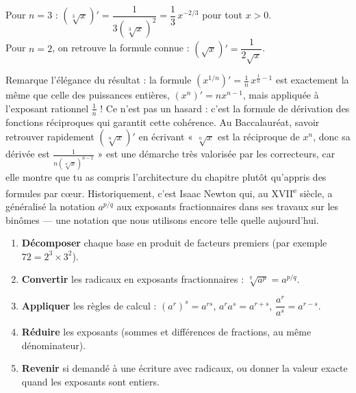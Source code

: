 \documentclass[11pt]{article}
\begin{document}
\begin{exemplebox}
Pour $n = 3$ : $\left(\sqrt[3]{x}\right)' = \dfrac{1}{3\left(\sqrt[3]{x}\right)^2} = \dfrac{1}{3}\,x^{-2/3}$ pour tout $x > 0$.\\
Pour $n = 2$, on retrouve la formule connue : $(\sqrt{x})' = \dfrac{1}{2\sqrt{x}}$.
\end{exemplebox}

\begin{savaistu}
Remarque l'élégance du résultat : la formule $\left(x^{1/n}\right)' = \frac{1}{n}\,x^{\frac{1}{n}-1}$ est exactement la même que celle des puissances entières, $(x^n)' = n x^{n-1}$, mais appliquée à l'exposant rationnel $\frac{1}{n}$ ! Ce n'est pas un hasard : c'est la formule de dérivation des fonctions réciproques qui garantit cette cohérence. Au Baccalauréat, savoir retrouver rapidement $(\sqrt[n]{x})'$ en écrivant « $\sqrt[n]{x}$ est la réciproque de $x^n$, donc sa dérivée est $\frac{1}{n(\sqrt[n]{x})^{n-1}}$ » est une démarche très valorisée par les correcteurs, car elle montre que tu as compris l'architecture du chapitre plutôt qu'appris des formules par cœur. Historiquement, c'est Isaac Newton qui, au XVII\textsuperscript{e} siècle, a généralisé la notation $a^{p/q}$ aux exposants fractionnaires dans ses travaux sur les binômes — une notation que nous utilisons encore telle quelle aujourd'hui.
\end{savaistu}

\begin{methode}
\begin{enumerate}
\item \textbf{Décomposer} chaque base en produit de facteurs premiers (par exemple $72 = 2^3 \times 3^2$).
\item \textbf{Convertir} les radicaux en exposants fractionnaires : $\sqrt[q]{a^p} = a^{p/q}$.
\item \textbf{Appliquer} les règles de calcul : $(a^r)^s = a^{rs}$, $a^r a^s = a^{r+s}$, $\dfrac{a^r}{a^s} = a^{r-s}$.
\item \textbf{Réduire} les exposants (sommes et différences de fractions, au même dénominateur).
\item \textbf{Revenir} si demandé à une écriture avec radicaux, ou donner la valeur exacte quand les exposants sont entiers.
\end{enumerate}
\end{methode}
\end{document}
